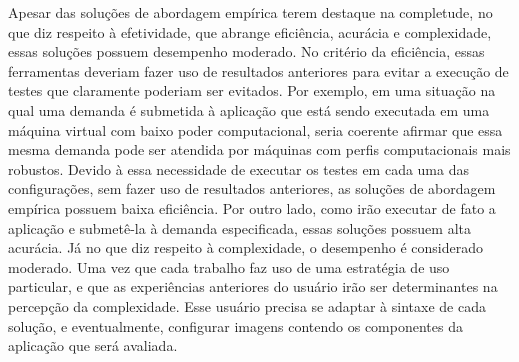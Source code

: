 Apesar das soluções de abordagem empírica terem destaque na completude, no que
diz respeito à efetividade, que abrange eficiência, acurácia e complexidade,
essas soluções possuem desempenho moderado. No critério da eficiência, essas
ferramentas deveriam fazer uso de resultados anteriores para evitar a execução
de testes que claramente poderiam ser evitados. Por exemplo, em uma situação na qual uma demanda é submetida à aplicação que está sendo
executada em uma máquina virtual com baixo poder computacional, seria coerente
afirmar que essa mesma demanda pode ser atendida por máquinas com perfis
computacionais mais robustos. Devido à essa necessidade de executar os testes em
cada uma das configurações, sem fazer uso de resultados anteriores, as soluções
de abordagem empírica possuem baixa eficiência. Por outro lado, como irão
executar de fato a aplicação e submetê-la à demanda especificada, essas soluções
possuem alta acurácia. Já no que diz respeito à complexidade, o desempenho é
considerado moderado. Uma vez que cada trabalho faz uso de uma estratégia
de uso particular, e que as experiências anteriores do usuário irão ser
determinantes na percepção da complexidade. Esse usuário precisa se adaptar à
sintaxe de cada solução, e eventualmente, configurar imagens contendo os
componentes da aplicação que será avaliada.







